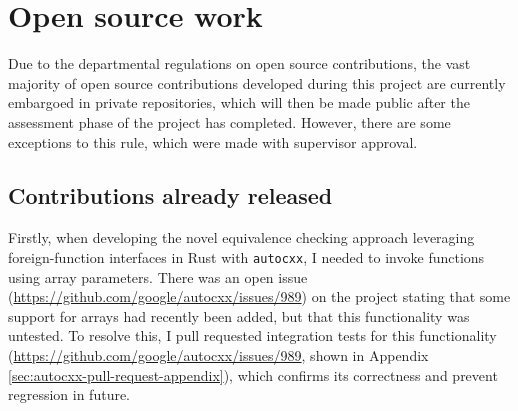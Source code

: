 
\section{Open source work}
\label{sec:open-source-work}


Due to the departmental regulations on open source contributions, the vast majority of open source contributions developed during this project are currently embargoed in private repositories, which will then be made public after the assessment phase of the project has completed. However, there are some exceptions to this rule, which were made with supervisor approval.

\subsection{Contributions already released}
\label{ssec:open-source-already-released}

Firstly, when developing the novel equivalence checking approach leveraging foreign-function interfaces in Rust with \texttt{autocxx}, I needed to invoke functions using array parameters. There was an open issue (\url{https://github.com/google/autocxx/issues/989}) on the project stating that some support for arrays had recently been added, but that this functionality was untested. To resolve this, I pull requested integration tests for this functionality (\url{https://github.com/google/autocxx/issues/989}, shown in Appendix \ref{sec:autocxx-pull-request-appendix}), which confirms its correctness and prevent regression in future.

